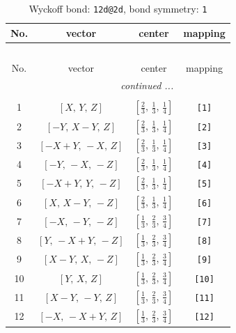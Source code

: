 \documentclass[fleqn,8pt]{jsarticle}
\begin{document}
\begin{longtable}{cccc}
\caption{Wyckoff bond: {\tt 12d@2d}, bond symmetry: {\tt 1}}
 \\
 \hline \hline
No. & vector & center & mapping \\ \hline \endfirsthead

\multicolumn{3}{l}{\tablename\ \thetable{}} \\
 \hline \hline
No. & vector & center & mapping \\ \hline \endhead

 \hline \hline
\multicolumn{3}{r}{\footnotesize\it continued ...} \\ \endfoot

 \hline \hline
\multicolumn{3}{r}{} \\ \endlastfoot

1 & $\left[ X,\, Y,\, Z \right]$ & $\left[ \frac{2}{3},\, \frac{1}{3},\, \frac{1}{4} \right]$ & {\tt [1]} \\ \hline
2 & $\left[ - Y,\, X - Y,\, Z \right]$ & $\left[ \frac{2}{3},\, \frac{1}{3},\, \frac{1}{4} \right]$ & {\tt [2]} \\ \hline
3 & $\left[ - X + Y,\, - X,\, Z \right]$ & $\left[ \frac{2}{3},\, \frac{1}{3},\, \frac{1}{4} \right]$ & {\tt [3]} \\ \hline
4 & $\left[ - Y,\, - X,\, - Z \right]$ & $\left[ \frac{2}{3},\, \frac{1}{3},\, \frac{1}{4} \right]$ & {\tt [4]} \\ \hline
5 & $\left[ - X + Y,\, Y,\, - Z \right]$ & $\left[ \frac{2}{3},\, \frac{1}{3},\, \frac{1}{4} \right]$ & {\tt [5]} \\ \hline
6 & $\left[ X,\, X - Y,\, - Z \right]$ & $\left[ \frac{2}{3},\, \frac{1}{3},\, \frac{1}{4} \right]$ & {\tt [6]} \\ \hline
7 & $\left[ - X,\, - Y,\, - Z \right]$ & $\left[ \frac{1}{3},\, \frac{2}{3},\, \frac{3}{4} \right]$ & {\tt [7]} \\ \hline
8 & $\left[ Y,\, - X + Y,\, - Z \right]$ & $\left[ \frac{1}{3},\, \frac{2}{3},\, \frac{3}{4} \right]$ & {\tt [8]} \\ \hline
9 & $\left[ X - Y,\, X,\, - Z \right]$ & $\left[ \frac{1}{3},\, \frac{2}{3},\, \frac{3}{4} \right]$ & {\tt [9]} \\ \hline
10 & $\left[ Y,\, X,\, Z \right]$ & $\left[ \frac{1}{3},\, \frac{2}{3},\, \frac{3}{4} \right]$ & {\tt [10]} \\ \hline
11 & $\left[ X - Y,\, - Y,\, Z \right]$ & $\left[ \frac{1}{3},\, \frac{2}{3},\, \frac{3}{4} \right]$ & {\tt [11]} \\ \hline
12 & $\left[ - X,\, - X + Y,\, Z \right]$ & $\left[ \frac{1}{3},\, \frac{2}{3},\, \frac{3}{4} \right]$ & {\tt [12]} \\
\end{longtable}
\end{document}
